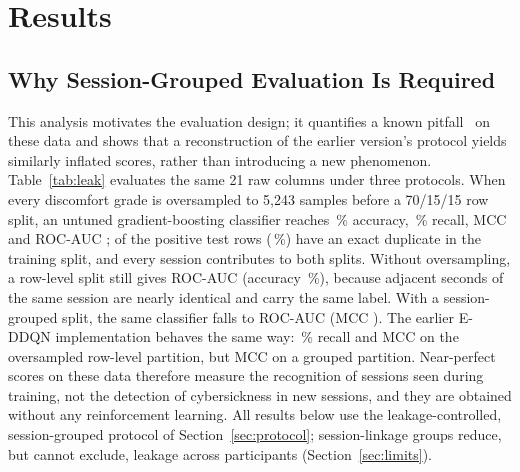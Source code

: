\section{Results}
\label{sec:results}

\subsection{Why Session-Grouped Evaluation Is Required}
\label{sec:leak}
This analysis motivates the evaluation design; it quantifies a known pitfall~\cite{kapoor2023leakage,kaufman2012leakage} on these data and shows that a reconstruction of the earlier version's protocol yields similarly inflated scores, rather than introducing a new phenomenon. Table~\ref{tab:leak} evaluates the same 21 raw columns under three protocols. When every discomfort grade is oversampled to 5,243 samples before a 70/15/15 row split, an untuned gradient-boosting classifier reaches \LeakOldAcc\,\% accuracy, \LeakOldRecall\,\% recall, MCC \LeakOldMCC{} and ROC-AUC \LeakOldRocAuc; \LeakDupPos{} of the \LeakTestPos{} positive test rows (\LeakDupPct\,\%) have an exact duplicate in the training split, and every session contributes to both splits. Without oversampling, a row-level split still gives ROC-AUC \LeakRowRocAuc{} (accuracy \LeakRowAcc\,\%), because adjacent seconds of the same session are nearly identical and carry the same label. With a session-grouped split, the same classifier falls to ROC-AUC \LeakGrpRocAuc{} (MCC \LeakGrpMCC). The earlier E-DDQN implementation behaves the same way: \OrigOldRecall\,\% recall and MCC \OrigOldMCC{} on the oversampled row-level partition, but MCC \OrigGrpMCC{} on a grouped partition. Near-perfect scores on these data therefore measure the recognition of sessions seen during training, not the detection of cybersickness in new sessions, and they are obtained without any reinforcement learning. All results below use the leakage-controlled, session-grouped protocol of Section~\ref{sec:protocol}; session-linkage groups reduce, but cannot exclude, leakage across participants (Section~\ref{sec:limits}).

\begin{table}[t]
\centering
\caption{Effect of the evaluation protocol on the same data (21 raw columns of the curated release; test-split metrics). ``Proxy'' marks the reconstruction of the earlier protocol, whose 41-feature input files were not available.}
\label{tab:leak}
\resizebox{\textwidth}{!}{}
\end{table}

